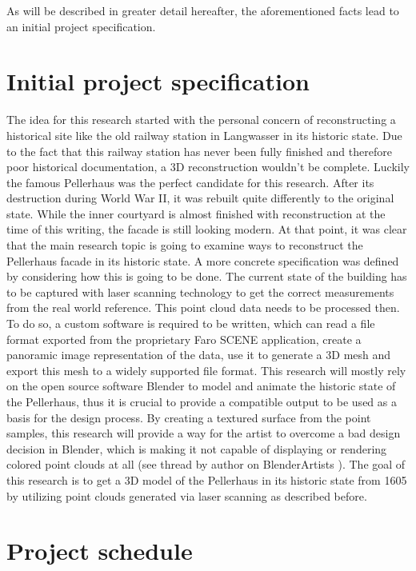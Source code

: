 As will be described in greater detail hereafter, the aforementioned facts lead to an initial project specification. 


\section{Initial project specification}

The idea for this research started with the personal concern of reconstructing a historical site like the old railway station in Langwasser in its historic state. Due to the fact that this railway station has never been fully finished and therefore poor historical documentation, a 3D reconstruction wouldn't be complete. Luckily the famous Pellerhaus was the perfect candidate for this research. After its destruction during World War II, it was rebuilt quite differently to the original state. While the inner courtyard is almost finished with reconstruction at the time of this writing, the facade is still looking modern. At that point, it was clear that the main research topic is going to examine ways to reconstruct the Pellerhaus facade in its historic state.
A more concrete specification was defined by considering how this is going to be done. The current state of the building has to be captured with laser scanning technology to get the correct measurements from the real world reference. This point cloud data needs to be processed then. To do so, a custom software is required to be written, which can read a file format exported from the proprietary Faro SCENE application, create a panoramic image representation of the data, use it to generate a 3D mesh and export this mesh to a widely supported file format. This research will mostly rely on the open source software Blender to model and animate the historic state of the Pellerhaus, thus it is crucial to provide a compatible output to be used as a basis for the design process. By creating a textured surface from the point samples, this research will provide a way for the artist to overcome a bad design decision in Blender, which is making it not capable of displaying or rendering colored point clouds at all (see thread by author on BlenderArtists \parencite{webBlenderArtistsPointCloudSupport} ). The goal of this research is to get a 3D model of the Pellerhaus in its historic state from 1605 by utilizing point clouds generated via laser scanning as described before.

\section{Project schedule}

